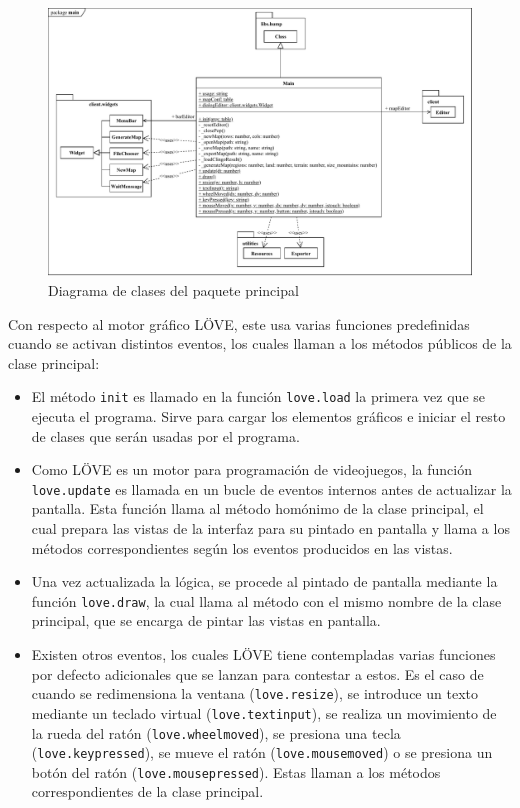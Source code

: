 \begin{figure}[!h]
	\centering
	\includegraphics[width=\textwidth]{images/clase-principal.pdf}
	\caption{Diagrama de clases del paquete principal}
	\label{fig:mainclass}
\end{figure}

Con respecto al motor gráfico LÖVE, este usa varias funciones predefinidas cuando se activan distintos eventos, los cuales llaman a los métodos públicos de la clase principal:

\begin{itemize}
	\item El método \texttt{init} es llamado en la función \texttt{love.load} la primera vez que se ejecuta el programa. Sirve para cargar los elementos gráficos e iniciar el resto de clases que serán usadas por el programa.
	\item Como LÖVE es un motor para programación de videojuegos, la función \texttt{love.update} es llamada en un bucle de eventos internos antes de actualizar la pantalla. Esta función llama al método homónimo de la clase principal, el cual prepara las vistas de la interfaz para su pintado en pantalla y llama a los métodos correspondientes según los eventos producidos en las vistas.
	\item Una vez actualizada la lógica, se procede al pintado de pantalla mediante la función \texttt{love.draw}, la cual llama al método con el mismo nombre de la clase principal, que se encarga de pintar las vistas en pantalla.
	\item Existen otros eventos, los cuales LÖVE tiene contempladas varias funciones por defecto adicionales que se lanzan para contestar a estos. Es el caso de cuando se redimensiona la ventana (\texttt{love.resize}), se introduce un texto mediante un teclado virtual (\texttt{love.textinput}), se realiza un movimiento de la rueda del ratón (\texttt{love.wheelmoved}), se presiona una tecla (\texttt{love.keypressed}), se mueve el ratón (\texttt{love.mousemoved}) o se presiona un botón del ratón (\texttt{love.mousepressed}). Estas llaman a los métodos correspondientes de la clase principal.
\end{itemize}

